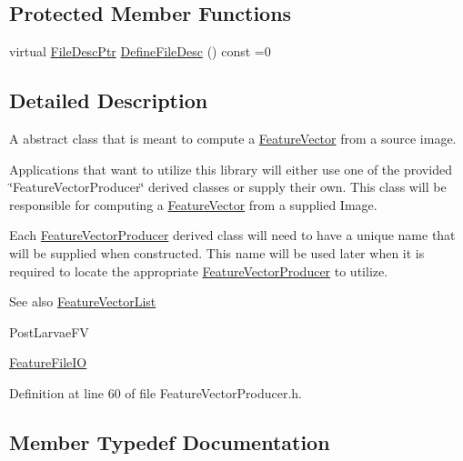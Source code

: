 \subsection*{Protected Member Functions}
\begin{DoxyCompactItemize}
\item 
virtual \hyperlink{namespace_k_k_m_l_l_aa0d0b6ab4ec18868a399b8455b05d914}{File\+Desc\+Ptr} \hyperlink{class_k_k_m_l_l_1_1_feature_vector_producer_a14067d343fed61b78aab6962850b3c34}{Define\+File\+Desc} () const  =0
\end{DoxyCompactItemize}


\subsection{Detailed Description}
A abstract class that is meant to compute a \hyperlink{class_k_k_m_l_l_1_1_feature_vector}{Feature\+Vector} from a source image. 

Applications that want to utilize this library will either use one of the provided \char`\"{}\+Feature\+Vector\+Producer\char`\"{} derived classes or supply their own. This class will be responsible for computing a \hyperlink{class_k_k_m_l_l_1_1_feature_vector}{Feature\+Vector} from a supplied Image.

Each \hyperlink{class_k_k_m_l_l_1_1_feature_vector_producer}{Feature\+Vector\+Producer} derived class will need to have a unique name that will be supplied when constructed. This name will be used later when it is required to locate the appropriate \hyperlink{class_k_k_m_l_l_1_1_feature_vector_producer}{Feature\+Vector\+Producer} to utilize. \begin{DoxySeeAlso}{See also}
\hyperlink{class_k_k_m_l_l_1_1_feature_vector_list}{Feature\+Vector\+List} 

Post\+Larvae\+FV 

\hyperlink{class_k_k_m_l_l_1_1_feature_file_i_o}{Feature\+File\+IO} 
\end{DoxySeeAlso}


Definition at line 60 of file Feature\+Vector\+Producer.\+h.



\subsection{Member Typedef Documentation}
